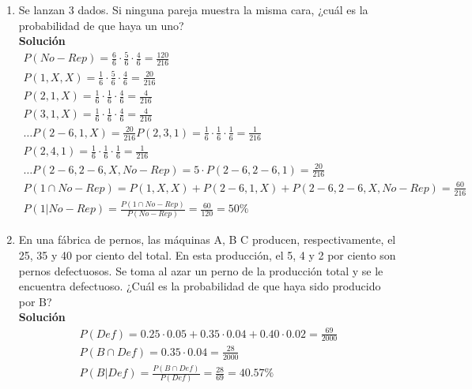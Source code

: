 \begin{enumerate}
    \item Se lanzan 3 dados. Si  ninguna pareja muestra la misma cara, ¿cuál es la probabilidad de que haya un uno?
    \\\textbf{Solución}
    \begin{gather*}
    P(No-Rep) = \frac{6}{6} \cdot \frac{5}{6} \cdot \frac{4}{6} = \frac{120}{216} \\
    P(1,X,X) = \frac{1}{6} \cdot \frac{5}{6} \cdot \frac{4}{6} = \frac{20}{216} \\
    P(2,1,X) = \frac{1}{6} \cdot \frac{1}{6} \cdot \frac{4}{6} = \frac{4}{216} \\
    P(3,1,X) = \frac{1}{6} \cdot \frac{1}{6} \cdot \frac{4}{6} = \frac{4}{216} \\
    \ldots P(2-6,1,X) = \frac{20}{216}
    P(2,3,1) = \frac{1}{6} \cdot \frac{1}{6} \cdot \frac{1}{6} = \frac{1}{216} \\
    P(2,4,1) = \frac{1}{6} \cdot \frac{1}{6} \cdot \frac{1}{6} = \frac{1}{216} \\
    \ldots P(2-6,2-6,X,No-Rep) = 5 \cdot P(2-6,2-6,1) = \frac{20}{216} \\
    P(1 \cap No-Rep) = P(1,X,X) + P(2-6,1,X) + P(2-6,2-6,X,No-Rep) = \frac{60}{216} \\
    P(1 | No-Rep) = \frac{P(1 \cap No-Rep)}{P(No-Rep)} = \frac{60}{120} = 50\%
    \end{gather*}
    
    \item En una fábrica de pernos, las máquinas A, B C producen, respectivamente, el 25, 35 y 40 por ciento del total. En esta producción, el 5, 4 y 2 por ciento son pernos defectuosos. Se toma al azar un perno de la producción total y se le encuentra defectuoso. ¿Cuál es la probabilidad de que haya sido producido por B?
    \\\textbf{Solución}
    \begin{gather*}
    P(Def) = 0.25 \cdot 0.05 + 0.35 \cdot 0.04 + 0.40 \cdot 0.02 = \frac{69}{2000} \\
    P(B \cap Def) = 0.35 \cdot 0.04 = \frac{28}{2000} \\
    P(B | Def) = \frac{P(B \cap Def)}{P(Def)} = \frac{28}{69} = 40.57\%
    \end{gather*}
    

\end{enumerate}
